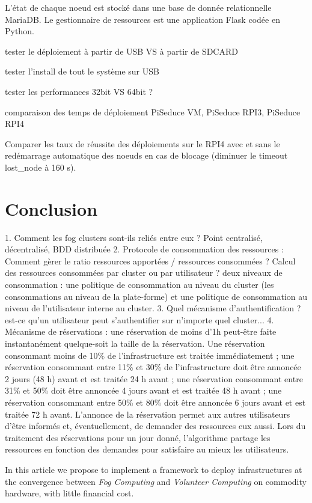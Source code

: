 \documentclass[letterpaper, 10 pt, conference]{ieeeconf}
\begin{document}
L'état de chaque noeud est stocké dans une base de donnée relationnelle MariaDB. Le gestionnaire de ressources est une application Flask codée en Python.

tester le déploiement à partir de USB VS à partir de SDCARD

tester l'install de tout le système sur USB

tester les performances 32bit VS 64bit ?

comparaison des temps de déploiement PiSeduce VM, PiSeduce RPI3, PiSeduce RPI4

Comparer les taux de réussite des déploiements sur le RPI4 avec et sans le redémarrage automatique des noeuds en cas de blocage (diminuer le timeout lost\_node à 160 s).

\section{Conclusion}
1. Comment les fog clusters sont-ils reliés entre eux ? Point centralisé, décentralisé, BDD distribuée
2. Protocole de consommation des ressources : Comment gèrer le ratio ressources apportées / ressources consommées ? Calcul des ressources consommées par cluster ou par utilisateur ?
deux niveaux de consommation : une politique de consommation au niveau du cluster (les consommations au niveau de la plate-forme) et une politique de consommation au niveau de l'utilisateur interne au cluster.
3. Quel mécanisme d'authentification ? est-ce qu'un utilisateur peut s'authentifier sur n'importe quel cluster...
4. Mécanisme de réservations : une réservation de moins d'1h peut-être faite instantanément quelque-soit la taille de la réservation. Une réservation consommant moins de 10\% de l'infrastructure
est traitée immédiatement ; une réservation consommant entre 11\% et 30\% de l'infrastructure doit être annoncée 2 jours (48 h) avant et est traitée 24 h avant ; une réservation consommant entre 31\% et 50\% doit être annoncée 4 jours avant et est traitée 48 h avant ; une réservation consommant entre 50\% et 80\% doit être annoncée 6 jours avant et est traitée 72 h avant. L'annonce de la réservation permet aux autres utilisateurs d'être informés et, éventuellement, de demander des ressources eux aussi. Lors du traitement des réservations pour un jour donné, l'algorithme partage les ressources en fonction des demandes pour satisfaire au mieux les utilisateurs.


In this article we propose to implement a framework to deploy infrastructures at the convergence between \textit{Fog Computing} and \textit{Volunteer Computing} on commodity hardware, with little financial cost.





\clearpage
\end{document}
